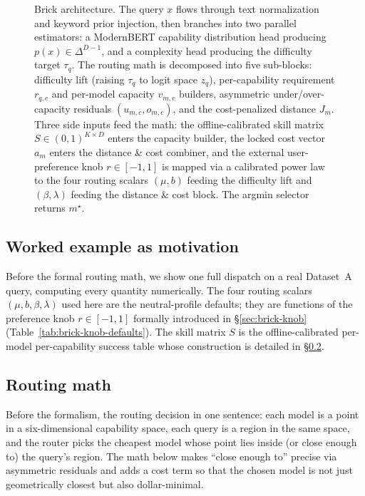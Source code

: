 \documentclass[twocolumn,10pt,a4paper]{article}
\begin{document}
\begin{figure}[!t]
\centering

\caption{Brick architecture. The query $x$ flows through text normalization and keyword prior injection, then branches into two parallel estimators: a ModernBERT capability distribution head producing $p(x)\!\in\!\Delta^{D-1}$, and a complexity head producing the difficulty target $\tau_q$. The routing math is decomposed into five sub-blocks: difficulty lift (raising $\tau_q$ to logit space $z_q$), per-capability requirement $r_{q,c}$ and per-model capacity $v_{m,c}$ builders, asymmetric under/over-capacity residuals $(u_{m,c}, o_{m,c})$, and the cost-penalized distance $J_m$. Three side inputs feed the math: the offline-calibrated skill matrix $S\!\in\!(0,1)^{K\!\times\!D}$ enters the capacity builder, the locked cost vector $a_m$ enters the distance \& cost combiner, and the external user-preference knob $r\!\in\![-1,1]$ is mapped via a calibrated power law to the four routing scalars $(\mu, b)$ feeding the difficulty lift and $(\beta, \lambda)$ feeding the distance \& cost block. The argmin selector returns $m^{\star}$.}
\label{fig:brick-arch}
\end{figure}

\subsection{Worked example as motivation}\label{sec:brick-example}
Before the formal routing math, we show one full dispatch on a real Dataset~A query, computing every quantity numerically. The four routing scalars $(\mu, b, \beta, \lambda)$ used here are the neutral-profile defaults; they are functions of the preference knob $r\!\in\![-1,1]$ formally introduced in §\ref{sec:brick-knob} (Table~\ref{tab:brick-knob-defaults}). The skill matrix $S$ is the offline-calibrated per-model per-capability success table whose construction is detailed in §\ref{sec:brick-math}.



\subsection{Routing math}\label{sec:brick-math}
Before the formalism, the routing decision in one sentence: each model is a point in a six-dimensional capability space, each query is a region in the same space, and the router picks the cheapest model whose point lies inside (or close enough to) the query's region. The math below makes ``close enough to'' precise via asymmetric residuals and adds a cost term so that the chosen model is not just geometrically closest but also dollar-minimal.
\end{document}
